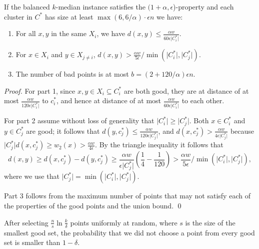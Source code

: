 \documentclass{llncs} \usepackage{algorithm}
\begin{document}
\begin{lemma}\label{lemma:structureBalancedKMedian}
If the balanced $k$-median instance satisfies the $(1+\alpha,\epsilon$)-property and each cluster in $C^{\ast}$ has size at least $\max(6,6/\alpha) \cdot \epsilon n$ we have:
\begin{enumerate}
\item For all $x,y$ in the same $X_{i}$, we have $d(x,y) \le \frac{\alpha w}{60 \epsilon \vert C_{i}^{\ast} \vert}$.
\item For $x \in X_{i}$ and $y \in X_{j \ne i}$, $d(x,y) > \frac{\alpha w}{5 \epsilon}/ \min(\vert C_{i}^{\ast} \vert, \vert C_{j}^{\ast} \vert)$.
\item The number of bad points is at most $b=(2+120/\alpha)\epsilon n$.
\end{enumerate}
\end{lemma}

\begin{proof}
For part 1, since $x,y \in X_{i} \subseteq C_{i}^{\ast}$ are both good, they are at distance of at most $\frac{\alpha w}{120 \epsilon \vert C_{i}^{\ast} \vert}$ to $c_{i}^{\ast}$, and hence at distance of at most $\frac{\alpha w}{60 \epsilon \vert C_{i}^{\ast} \vert}$ to each other.

For part 2 assume without loss of generality that $\vert C_{i}^{\ast} \vert \ge \vert C_{j}^{\ast} \vert$.  Both $x \in C_{i}^{\ast}$ and $y \in C_{j}^{\ast}$ are good; it follows that $d(y,c_{j}^{\ast}) \le \frac{\alpha w}{120 \epsilon \vert C_{j}^{\ast} \vert}$, and $d(x,c_{j}^{\ast}) > \frac{\alpha w}{4 \epsilon \vert C_{j}^{\ast} \vert}$ because $\vert C_{j}^{\ast} \vert d(x,c_{j}^{\ast}) \ge w_{2}(x) > \frac{\alpha w}{4 \epsilon}$.  By the triangle inequality it follows that
\begin{displaymath}
d(x,y) \ge d(x,c_{j}^{\ast}) - d(y,c_{j}^{\ast}) \ge \frac{\alpha w}{\epsilon \vert C_{j}^{\ast} \vert}(\frac{1}{4} - \frac{1}{120}) > \frac{\alpha w}{5 \epsilon}/ \min(\vert C_{i}^{\ast} \vert, \vert C_{j}^{\ast} \vert),
\end{displaymath}
where we use that $\vert C_{j}^{\ast} \vert = \min(\vert C_{i}^{\ast} \vert, \vert C_{j}^{\ast} \vert)$.

Part 3 follows from the maximum number of points that may not satisfy each of the properties of the good points and the union bound. \qed
\end{proof}

\begin{lemma}\label{lemma:numberSamples}
After selecting $\frac{n}{s}\ln\frac{k}{\delta}$ points uniformly at random, where $s$ is the size of the smallest good set, the probability that we did not choose a point from every good set is smaller than $1-\delta$.

\end{lemma}
\end{document}
